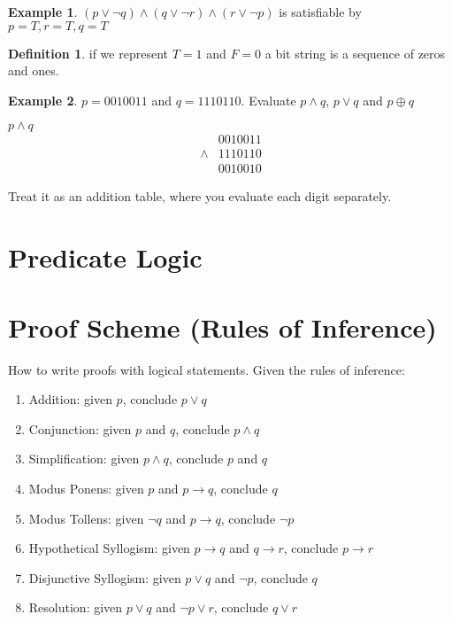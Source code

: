 \documentclass[11pt]{article}
\theoremstyle{definition}
\newtheorem{defn}{Definition}
\newtheorem{eg}{Example}
\begin{document}
\begin{eg}
$(p \lor \neg q) \land (q \lor \neg r) \land (r \lor \neg p)$ is satisfiable by $p = T, r = T, q = T$
\end{eg}

\begin{defn}
if we represent $T= 1$ and $F = 0$ a bit string is a sequence of zeros and ones. 
\end{defn}

\begin{eg}
$p = 0010011$ and $q = 1110110$. Evaluate $p \land q$, $p \lor q$ and $p \oplus q$

$p \land q$
\begin{align*}
& 0010011 \\
\land & 1110110 \\
& 0010010
\end{align*}

Treat it as an addition table, where you evaluate each digit separately. 
\end{eg}

\section{Predicate Logic}

\section{Proof Scheme (Rules of Inference)}
How to write proofs with logical statements. Given the rules of inference:

\begin{enumerate}
\item Addition: given $p$, conclude $p \lor q$
\item Conjunction: given $p$ and $q$, conclude $p \land q$
\item Simplification: given $p \land q$, conclude $p$ and $q$
\item Modus Ponens: given $p$ and $p \rightarrow q$, conclude $q$
\item Modus Tollens: given $\neg q$ and $p\rightarrow q$, conclude $\neg p$
\item Hypothetical Syllogism: given $p\rightarrow q$ and $q\rightarrow r$, conclude $p\rightarrow r$
\item Disjunctive Syllogism: given $p\lor q$ and $\neg p$, conclude $q$
\item Resolution: given $p\lor q$ and $\neg p \lor r$, conclude  $q\lor r$
\end{enumerate}
\end{document}
